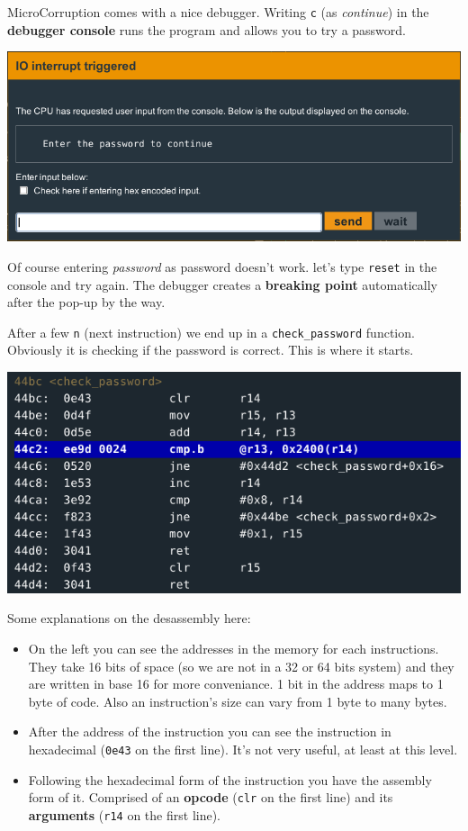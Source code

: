 \documentclass[a4paper,11pt]{article}
\begin{document}
MicroCorruption comes with a nice debugger. Writing \texttt{c} (as
\emph{continue}) in the \textbf{debugger console} runs the program and
allows you to try a password.

\includegraphics{img/1_2.png}

Of course entering \emph{password} as password doesn't work. let's type
\texttt{reset} in the console and try again. The debugger creates a
\textbf{breaking point} automatically after the pop-up by the way.

After a few \texttt{n} (next instruction) we end up in a
\texttt{check\_password} function. Obviously it is checking if the
password is correct. This is where it starts.

\includegraphics{img/1_3.png}

Some explanations on the desassembly here:

\begin{itemize}
\item
  On the left you can see the addresses in the memory for each
  instructions. They take 16 bits of space (so we are not in a 32 or 64
  bits system) and they are written in base 16 for more conveniance. 1
  bit in the address maps to 1 byte of code. Also an instruction's size
  can vary from 1 byte to many bytes.
\item
  After the address of the instruction you can see the instruction in
  hexadecimal (\texttt{0e43} on the first line). It's not very useful,
  at least at this level.
\item
  Following the hexadecimal form of the instruction you have the
  assembly form of it. Comprised of an \textbf{opcode} (\texttt{clr} on
  the first line) and its \textbf{arguments} (\texttt{r14} on the first
  line).
\end{itemize}
\end{document}
